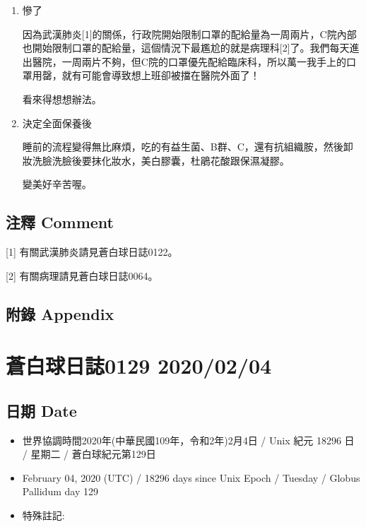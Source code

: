 \documentclass[a5paper, 12pt
]{book}
\providecommand{\tightlist}{%
  \setlength{\itemsep}{0pt}\setlength{\parskip}{0pt}}
\begin{document}
\begin{enumerate}
\def\labelenumi{\arabic{enumi}.}
\item
  慘了

  因為武漢肺炎{[}1{]}的關係，行政院開始限制口罩的配給量為一周兩片，C院內部也開始限制口罩的配給量，這個情況下最尷尬的就是病理科{[}2{]}了。我們每天進出醫院，一周兩片不夠，但C院的口罩優先配給臨床科，所以萬一我手上的口罩用罄，就有可能會導致想上班卻被擋在醫院外面了！

  看來得想想辦法。
\item
  決定全面保養後

  睡前的流程變得無比麻煩，吃的有益生菌、B群、C，還有抗組織胺，然後卸妝洗臉洗臉後要抹化妝水，美白膠囊，杜鵑花酸跟保濕凝膠。

  變美好辛苦喔。
\end{enumerate}

\hypertarget{ux6ce8ux91cb-comment-63}{%
\subsection{注釋 Comment}\label{ux6ce8ux91cb-comment-63}}

{[}1{]} 有關武漢肺炎請見蒼白球日誌0122。

{[}2{]} 有關病理請見蒼白球日誌0064。

\hypertarget{ux9644ux9304-appendix-64}{%
\subsection{附錄 Appendix}\label{ux9644ux9304-appendix-64}}

\hypertarget{ux84bcux767dux7403ux65e5ux8a8c0129-20200204}{%
\section{蒼白球日誌0129
2020/02/04}\label{ux84bcux767dux7403ux65e5ux8a8c0129-20200204}}

\hypertarget{ux65e5ux671f-date-65}{%
\subsection{日期 Date}\label{ux65e5ux671f-date-65}}

\begin{itemize}
\tightlist
\item
  世界協調時間2020年(中華民國109年，令和2年)2月4日 / Unix 紀元 18296 日
  / 星期二 / 蒼白球紀元第129日
\item
  February 04, 2020 (UTC) / 18296 days since Unix Epoch / Tuesday /
  Globus Pallidum day 129
\item
  特殊註記:
\end{itemize}
\end{document}
